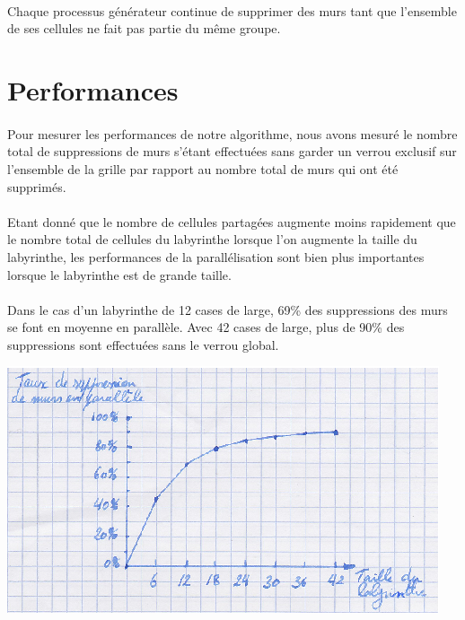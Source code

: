 \documentclass[a4paper,french]{article}
\begin{document}
    \paragraph{} Chaque processus générateur continue de supprimer des murs tant
que l'ensemble de ses cellules ne fait pas partie du même groupe.

\section{Performances}

    \paragraph{} Pour mesurer les performances de notre algorithme, nous avons
mesuré le nombre total de suppressions de murs s'étant effectuées sans garder un
verrou exclusif sur l'ensemble de la grille par rapport au nombre total de murs
qui ont été supprimés.

    \paragraph{} Etant donné que le nombre de cellules partagées augmente moins
rapidement que le nombre total de cellules du labyrinthe lorsque l'on augmente
la taille du labyrinthe, les performances de la parallélisation sont bien plus
importantes lorsque le labyrinthe est de grande taille.

    \paragraph{} Dans le cas d'un labyrinthe de 12 cases de large, 69\% des
suppressions des murs se font en moyenne en parallèle. Avec 42 cases de large,
plus de 90\% des suppressions sont effectuées sans le verrou global.

    \begin{center}
        \includegraphics{schema_performances.eps}
    \end{center}

    \paragraph{} 
\end{document}
